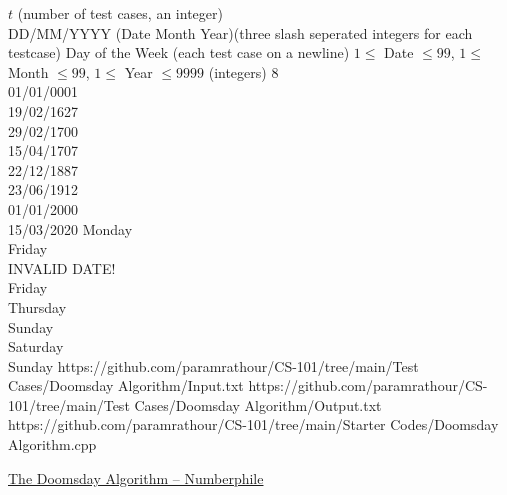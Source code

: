 \documentclass[../../Problems]{subfiles}
\begin{document}
\begin{testcasesMore}
	{$t$ \hfill(number of test cases, an integer)\\
	DD/MM/YYYY (Date Month Year)\hfill(three slash seperated integers for each testcase)}
	{Day of the Week
 \hfill{(each test case on a newline)}}
	{$1 \leq$ Date $\leq 99$, $1 \leq$ Month $\leq 99$, $1 \leq$ Year $\leq 9999$ \hfill(integers)}
	{8\\01/01/0001\\19/02/1627\\29/02/1700\\15/04/1707\\22/12/1887\\23/06/1912\\01/01/2000\\15/03/2020}
	{Monday\\Friday\\INVALID DATE!\\Friday\\Thursday\\Sunday\\Saturday\\Sunday}
	{https://github.com/paramrathour/CS-101/tree/main/Test Cases/Doomsday Algorithm/Input.txt}
	{https://github.com/paramrathour/CS-101/tree/main/Test Cases/Doomsday Algorithm/Output.txt}
	{https://github.com/paramrathour/CS-101/tree/main/Starter Codes/Doomsday Algorithm.cpp}
\end{testcasesMore}
\begin{funvideo}{\label{sec:fvdoomsday}}
\href{https://youtu.be/z2x3SSBVGJU}{The Doomsday Algorithm -- Numberphile}
\end{funvideo}
\end{document}
